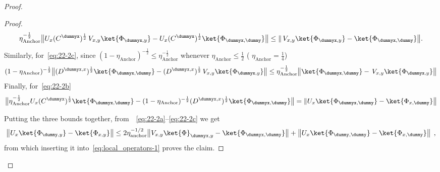 \begin{proof}
\begin{proof}
		\begin{equation*}
			\eta_{\text{Anchor}}^{-\frac{1}{2}} \big \|  U_x  (C^{\dummyx})^{\frac{1}{2}}  \, V_{x,y} \ket{\Phi_{\dummyx,y}} -  U_x  (C^{\dummyx})^{\frac{1}{2}} \ket{\Phi_{\dummyx, \dummy}} \big \| \leq  \|  \, V_{x,y} \ket{\Phi_{\dummyx,y}} -  \ket{\Phi_{\dummyx, \dummy}} \big \|.
		\end{equation*}
		Similarly, for~\eqref{eq:22-2c}, since $	(1-\eta_{\text{Anchor}})^{-\frac{1}{2}}  \leq \eta_{\text{Anchor}}^{-\frac{1}{2}}$ whenever $\eta_{\text{Anchor}} \leq \frac{1}{2}$ ( $\eta_{\text{Anchor}} = \frac{1}{4}$)
		\begin{equation*}
			(1-\eta_{\text{Anchor}})^{-\frac{1}{2}} \big \| (D^{\dummyx, x})^{\frac{1}{2}}  \ket{\Phi_{\dummyx,\dummy}} - (D^{\dummyx, x})^{\frac{1}{2}}   \, V_{x,y} \ket{\Phi_{\dummyx,y}} \big \| \leq \eta_{\text{Anchor}}^{-\frac{1}{2}} \big \|  \ket{\Phi_{\dummyx,\dummy}} -   \, V_{x,y} \ket{\Phi_{\dummyx,y}} \big \|
		\end{equation*}
		Finally, for~\eqref{eq:22-2b}
		\begin{equation*}
	 \big \|  \eta_{\text{Anchor}}^{-\frac{1}{2}} U_x  (C^{\dummyx})^{\frac{1}{2}} \ket{\Phi_{\dummyx,\dummy}} - 	(1-\eta_{\text{Anchor}})^{-\frac{1}{2}} (D^{\dummyx, x})^{\frac{1}{2}}     \ket{\Phi_{\dummyx,\dummy}} \big \| = \|  U_x   \ket{\Phi_{\dummyx,\dummy}} -     \ket{\Phi_{x,\dummy}} \big \| 
		\end{equation*}
		
		Putting the three bounds together, from~~\eqref{eq:22-2a}--\eqref{eq:22-2c} we get
		\begin{align}
			\left \| U_x \ket{\Phi_{\dummy,y}} - \ket{\Phi_{x,y}} \right \| \leq   2 \eta_{\text{anchor}}^{-1/2} \big \|  V_{x,y} \ket{\Phi}_{\dummyx,y} - \ket{{\Phi}_{\dummyx,\dummy}} \big \| + \left \|  U_x \ket{{\Phi}_{\dummy,\dummy}} -  \ket{{\Phi}_{x,\dummy}} \right \| \; , \label{eq:22-3}
		\end{align}
		from which inserting it into~\eqref{eq:local_operators-1} proves the claim. 
	\end{proof}
	

\end{proof}
